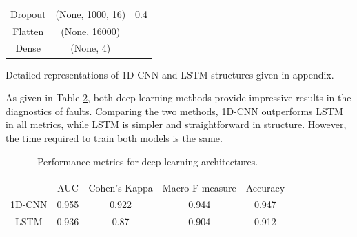 \begin{table}[h]
{\begin{center}
\begin{tabular}{ccc}
			Dropout            & (None, 1000, 16) & 0.4                                                                                                          \\
			Flatten            & (None, 16000)    &                                                                                                              \\
			Dense              & (None, 4)        &           \\                                                                                                  				
				\hline
			\end{tabular}
			\vspace{-6mm}
		\end{center}}
		\label{lstm}
\end{table}

Detailed representations of 1D-CNN and LSTM structures given in appendix. 

As given in Table \ref{deepl}, both deep learning methods provide impressive results in the diagnostics of faults. Comparing the two methods, 1D-CNN outperforms LSTM in all metrics, while LSTM is simpler and straightforward in structure. However, the time required to train both models is the same.

\begin{table}[h]
	{\setlength{\tabcolsep}{12pt}
 		\caption{Performance metrics for deep learning architectures.}
 		\begin{center}
 			\vspace{-6mm}
			\begin{tabular}{c|cccc}
				\hline \\[-2.45ex] \hline \\[-2.1ex]
				& AUC   & Cohen's Kappa & Macro F-measure & Accuracy \\

				\hline

			1D-CNN & 0.955 & 0.922         & 0.944           & 0.947    \\

			LSTM   & 0.936 & 0.87          & 0.904           & 0.912   \\
				\hline
			\end{tabular}
			\vspace{-6mm}
		\end{center}
		\label{deepl}}
\end{table}

